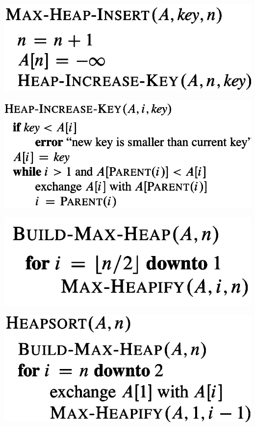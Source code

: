 {{\begin{minipage}[t]{0.35\textwidth}
        \vspace{6pt}
        
        \includegraphics[width=0.7\linewidth]{images/heap-insert.png}
        \vspace{6pt}
        
        \includegraphics[width=0.7\linewidth]{images/heap-increase-key.png}
        \vspace{6pt}
        
        \includegraphics[width=0.7\linewidth]{images/build-max-heap.png}
        \vspace{6pt}
        
        \includegraphics[width=0.7\linewidth]{images/heapsort.png}
    \end{minipage}
}} 